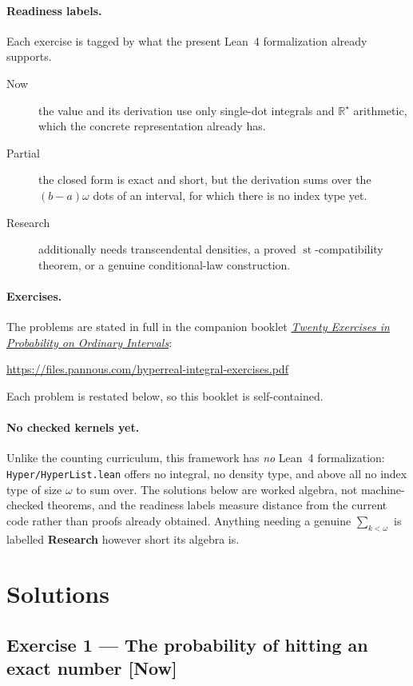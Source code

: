 \documentclass[11pt]{article}
\newcommand{\Rstar}{\mathbb{R}^{\star}}
\newcommand{\st}{\operatorname{st}}
\begin{document}
\paragraph{Readiness labels.} Each exercise is tagged by what the present
Lean~4 formalization already supports.
\begin{description}
\item[Now] the value and its derivation use only single-dot integrals and
$\Rstar$ arithmetic, which the concrete representation already has.
\item[Partial] the closed form is exact and short, but the derivation sums over
the $(b-a)\omega$ dots of an interval, for which there is no index type yet.
\item[Research] additionally needs transcendental densities, a proved
$\st$-compatibility theorem, or a genuine conditional-law construction.
\end{description}

\paragraph{Exercises.} The problems are stated in full in the companion
booklet \href{https://files.pannous.com/hyperreal-integral-exercises.pdf}{\emph{Twenty Exercises in Probability on Ordinary
Intervals}}:
\begin{center}\small\url{https://files.pannous.com/hyperreal-integral-exercises.pdf}\end{center}
Each problem is restated below, so this booklet is self-contained.

\paragraph{No checked kernels yet.} Unlike the counting curriculum, this
framework has \emph{no} Lean~4 formalization: \texttt{Hyper/HyperList.lean}
offers no integral, no density type, and above all no index type of size
$\omega$ to sum over. The solutions below are worked algebra, not machine-checked
theorems, and the readiness labels measure distance from the current code
rather than proofs already obtained. Anything needing a genuine
$\sum_{k<\omega}$ is labelled \textbf{Research} however short its algebra is.


\section*{Solutions}


\subsection*{Exercise 1 --- The probability of hitting an exact number \hfill \normalfont\small[Now]}
\end{document}
